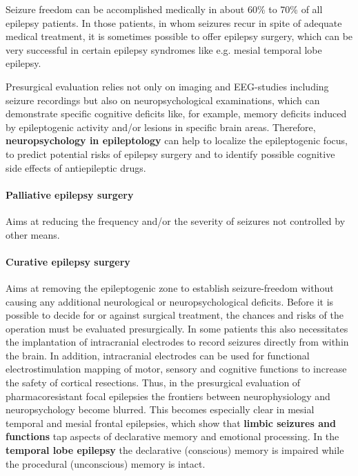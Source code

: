 \documentclass[12pt,article,oneside,a4paper]{memoir}
\begin{document}
Seizure freedom can be accomplished medically in about 60\% to 70\% of all
epilepsy patients. In those patients, in whom seizures recur in spite of
adequate medical treatment, it is sometimes possible to offer epilepsy surgery,
which can be very successful in certain epilepsy syndromes like e.g. mesial
temporal lobe epilepsy.

Presurgical evaluation relies not only on imaging and EEG-studies including
seizure recordings but also on neuropsychological examinations, which can
demonstrate specific cognitive deficits like, for example, memory deficits
induced by epileptogenic activity and/or lesions in specific brain areas.
Therefore, \textbf{neuropsychology in epileptology} can help to localize the
epileptogenic focus, to predict potential risks of epilepsy surgery and to
identify possible cognitive side effects of antiepileptic drugs.

\paragraph{Palliative epilepsy surgery}
Aims at reducing the frequency and/or the severity of seizures not controlled
by other means.

\paragraph{Curative epilepsy surgery}
Aims at removing the epileptogenic zone to establish seizure-freedom without
causing any additional neurological or neuropsychological deficits.
Before it is possible to decide for or against surgical treatment, the chances
and risks of the operation must be evaluated presurgically. In some patients
this also necessitates the implantation of intracranial electrodes to record
seizures directly from within the brain. In addition, intracranial electrodes
can be used for functional electrostimulation mapping of motor, sensory and
cognitive functions to increase the safety of cortical resections.
Thus, in the presurgical evaluation of pharmacoresistant focal epilepsies the
frontiers between neurophysiology and neuropsychology become blurred. This
becomes especially clear in mesial temporal and mesial frontal epilepsies,
which show that \textbf{limbic seizures and functions} tap aspects of declarative
memory and emotional processing.
In the \textbf{temporal lobe epilepsy} the declarative (conscious) memory is
impaired while the procedural (unconscious) memory is intact.

\newpage
\end{document}

